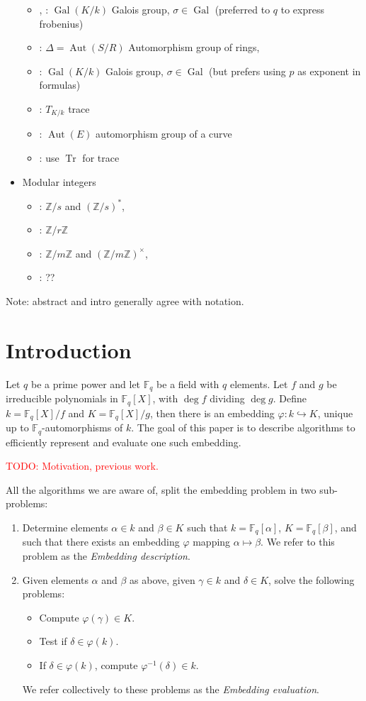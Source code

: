 \documentclass[12pt]{article}
\theoremstyle{plain}
\theoremstyle{definition}
\newcommand{\todo}[1]{\textcolor{red}{TODO: #1}}
\DeclareMathOperator{\trace}{Tr} %
\DeclareMathOperator{\gal}{Gal} %
\DeclareMathOperator{\Aut}{Aut}
\def\Z{\ensuremath{\mathbb{Z}}}
\def\F{\ensuremath{\mathbb{F}}}
\newcounter{algorithm}
\begin{document}
\begin{itemize}
\begin{itemize}
  \item \poster, \prop: $\gal(K/k)$ Galois group, $\sigma\in\gal$ (preferred
    to $q$ to express frobenius)
  \item \kummer: $\Delta=\Aut(S/R)$ Automorphism group of rings,
  \item \kummer: $\gal(K/k)$ Galois group, $\sigma\in\gal$ (but
    prefers using $p$ as exponent in formulas)
  \item \kummer: $T_{K/k}$ trace
  \item \rains: $\Aut(E)$ automorphism group of a curve
  \item \prop: use $\trace$ for trace
  \end{itemize}
\item Modular integers
  \begin{itemize}
  \item \poster: $\Z/s$ and $(\Z/s)^\ast$,
  \item \kummer: $\Z/r\Z$
  \item \rains: $\Z/m\Z$ and $(\Z/m\Z)^\times$,
  \item \prop: ??
  \end{itemize}
\end{itemize}

Note: abstract and intro generally agree with \poster{} notation.



\section{Introduction}

Let $q$ be a prime power and let $\F_q$ be a field with $q$
elements. Let $f$ and $g$ be irreducible polynomials in $\F_q[X]$,
with $\deg f$ dividing $\deg g$. Define $k=\F_q[X]/f$ and
$K=\F_q[X]/g$, then there is an embedding $\varphi:k\hookrightarrow
K$, unique up to $\F_q$-automorphisms of $k$. The goal of this paper
is to describe algorithms to efficiently represent and evaluate one
such embedding.

\todo{Motivation, previous work.}

All the algorithms we are aware of, split the embedding problem in two
sub-problems:
\begin{enumerate}
\item Determine elements $\alpha\in k$ and $\beta\in K$ such that
  $k=\F_q[\alpha]$, $K=\F_q[\beta]$, and such that there exists an
  embedding $\varphi$ mapping $\alpha\mapsto\beta$. We refer to this
  problem as the \emph{Embedding description}.
\item Given elements $\alpha$ and $\beta$ as above, given $\gamma\in
  k$ and $\delta\in K$, solve the following problems:
  \begin{itemize}
  \item Compute $\varphi(\gamma)\in K$.
  \item Test if $\delta\in\varphi(k)$.
  \item If $\delta\in\varphi(k)$, compute $\varphi^{-1}(\delta)\in k$.
  \end{itemize}
  We refer collectively to these problems as the \emph{Embedding
    evaluation}.
\end{enumerate}
\end{document}
